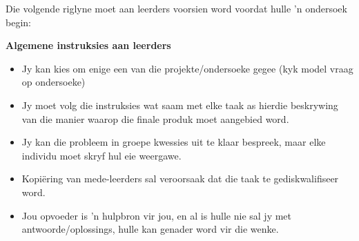 Die volgende riglyne moet aan leerders voorsien word voordat hulle 'n ondersoek begin:

\textbf{Algemene instruksies aan leerders}
\begin{itemize}[noitemsep]
\item
  Jy kan kies om enige een van die projekte/ondersoeke gegee (kyk model vraag op ondersoeke)
\item
  Jy moet volg die instruksies wat saam met elke taak as hierdie beskrywing van die manier waarop die finale produk moet aangebied word.
\item
  Jy kan die probleem in groepe kwessies uit te klaar bespreek, maar elke individu moet skryf hul eie weergawe.
\item
  Kopi\"{e}ring van mede-leerders sal veroorsaak dat die taak te gediskwalifiseer word.
\item
  Jou opvoeder is 'n hulpbron vir jou, en al is hulle nie sal jy met antwoorde/oplossings, hulle kan genader word vir die wenke.\end{itemize}	

